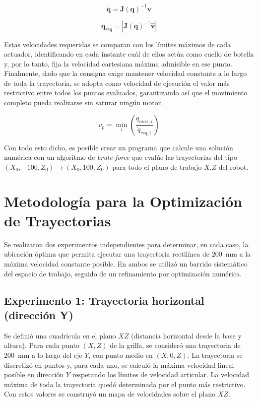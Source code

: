 \begin{equation}
	\dot{\mathbf{q}} = \mathbf{J}(\mathbf{q})^{-1} \mathbf{v}
\end{equation}

\begin{equation}
	\dot{\mathbf{q}}_{req} = | \mathbf{J}(\mathbf{q})^{-1} \mathbf{\hat{v}} |
\end{equation}

 Estas velocidades requeridas se comparan con los límites máximos de cada actuador, identificando en cada instante cuál de ellos actúa como cuello de botella y, por lo tanto, fija la velocidad cartesiana máxima admisible en ese punto. Finalmente, dado que la consigna exige mantener velocidad constante a lo largo de toda la trayectoria, se adopta como velocidad de ejecución el valor más restrictivo entre todos los puntos evaluados, garantizando así que el movimiento completo pueda realizarse sin saturar ningún motor.

\begin{equation}
	v_{p} = \min_{i} \left( \frac{\dot{q}_{max,i}}{\dot{q}_{req,i}} \right)
\end{equation}


Con todo esto dicho, es posible crear un programa que calcule una solución numérica con un algoritmo de \textit{brute-force} que evalúe las trayectorias del tipo $(X_0,-100,Z_0) \to (X_0,100,Z_0)$ para todo el plano de trabajo $X$,$Z$  del robot.


\clearpage
\section{Metodología para la Optimización de Trayectorias}

Se realizaron dos experimentos independientes para determinar, en cada caso, la ubicación óptima que permita ejecutar una trayectoria rectilínea de \SI{200}{\mm} a la máxima velocidad constante posible. En ambos se utilizó un barrido sistemático del espacio de trabajo, seguido de un refinamiento por optimización numérica.

\subsection{Experimento 1: Trayectoria horizontal (dirección Y)}
Se definió una cuadrícula en el plano $XZ$ (distancia horizontal desde la base y altura). Para cada punto $(X,Z)$ de la grilla, se consideró una trayectoria de \SI{200}{\mm} a lo largo del eje $Y$, con punto medio en $(X, 0, Z)$. La trayectoria se discretizó en puntos y, para cada uno, se calculó la máxima velocidad lineal posible en dirección $Y$ respetando los límites de velocidad articular. La velocidad máxima de toda la trayectoria quedó determinada por el punto más restrictivo. Con estos valores se construyó un mapa de velocidades sobre el plano $XZ$.


